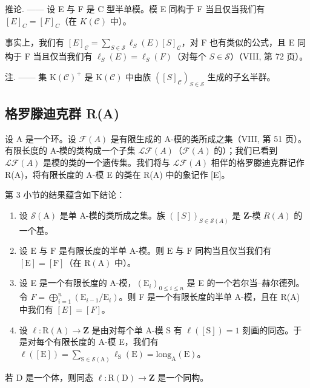 推论. —— 设 E 与 F 是 C 型半单模。模 E 同构于 F 当且仅当我们有 \([E]_{C} = [F]_{C}\)（在 \(K(\mathcal{C})\) 中）。

事实上，我们有 \([E]_{\mathcal{C}} = \sum_{S \in \mathcal{S}} \ell_{S}(E)[S]_{\mathcal{C}}\)，对 F 也有类似的公式，且 E 同构于 F 当且仅当我们有 \(\ell_{S}(E) = \ell_{S}(F)\)（对每个 \(S \in \mathcal{S}\)）（VIII, 第 72 页）。

注. —— 集 \(\mathrm{K}(\mathcal{C})^{+}\) 是 \(\mathrm{K}(\mathcal{C})\) 中由族 \(([S]_{\mathcal{C}})_{S\in\mathcal{S}}\) 生成的子幺半群。

\subsection{格罗滕迪克群 R(A)}

设 A 是一个环。设 \(\mathcal{F}(A)\) 是有限生成的 A-模的类所成之集（VIII, 第 51 页）。有限长度的 A-模的类构成一个子集 \(\mathcal{L}\mathcal{F}(A)\)（\(\mathcal{F}(A)\) 的）；我们已看到 \(\mathcal{L}\mathcal{F}(A)\) 是模的类的一个遗传集。我们将与 \(\mathcal{L}\mathcal{F}(A)\) 相伴的格罗滕迪克群记作 R(A)，将有限长度的 A-模 E 的类在 R(A) 中的象记作 {[}E{]}。

第 3 小节的结果蕴含如下结论：

\begin{enumerate}
\def\labelenumi{\alph{enumi})}
\item
  设 \(\mathcal{S}(\mathrm{A})\) 是单 A-模的类所成之集。族 \(([S])_{S\in \mathcal{S}(A)}\) 是 \(\mathbf{Z}\)-模 \(R(A)\) 的一个基。
\item
  设 \(\mathrm{E}\) 与 \(\mathrm{F}\) 是有限长度的半单 A-模。则 \(\mathrm{E}\) 与 \(\mathrm{F}\) 同构当且仅当我们有 \([\mathrm{E}] = [\mathrm{F}]\)（在 \(\mathrm{R(A)}\) 中）。
\item
  设 E 是一个有限长度的 A-模，\((\mathrm{E}_{i})_{0\leqslant i\leqslant n}\) 是 E 的一个若尔当–赫尔德列。令 \(F=\bigoplus_{i=1}^{n}(\mathrm{E}_{i-1}/\mathrm{E}_{i})\)。则 F 是一个有限长度的半单 A-模，且在 R(A) 中我们有 \([E]=[F]\)。
\item
  设 \(\ell : \mathrm{R}(\mathrm{A}) \to \mathbf{Z}\) 是由对每个单 A-模 S 有 \(\ell([\mathrm{S}]) = 1\) 刻画的同态。于是对每个有限长度的 A-模 E，我们有 \(\ell([\mathrm{E}]) = \sum_{\mathrm{S} \in \mathcal{S}(\mathrm{A})} \ell_{\mathrm{S}}(\mathrm{E}) = \mathrm{long}_{\mathrm{A}}(\mathrm{E})\)。
\end{enumerate}

若 D 是一个体，则同态 \(\ell: \mathrm{R}(\mathrm{D}) \to \mathbf{Z}\) 是一个同构。

